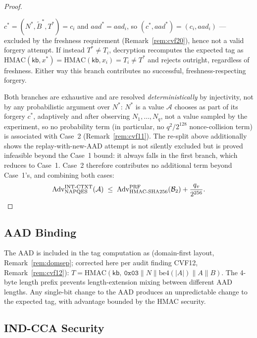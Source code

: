 \documentclass[11pt,a4paper]{article}
\begin{document}
\begin{proof}
\begin{itemize}
        $c^*=(N^*,\widetilde{B}^*,T^*)=c_i$ and $aad^*=aad_i$, so
        $(c^*,aad^*)=(c_i,aad_i)$ --- excluded by the freshness
        requirement (Remark~\ref{rem:cvf20}), hence not a valid forgery
        attempt. If instead $T^* \neq T_i$, decryption recomputes the
        expected tag as $\mathrm{HMAC}(\mathsf{kb},x^*) =
        \mathrm{HMAC}(\mathsf{kb},x_i) = T_i \neq T^*$ and rejects
        outright, regardless of freshness. Either way this branch
        contributes no successful, freshness-respecting forgery.
\end{itemize}
Both branches are exhaustive and are resolved \emph{deterministically} by
injectivity, not by any probabilistic argument over $N^*$: $N^*$ is a
value $\mathcal{A}$ chooses as part of its forgery $c^*$, adaptively and
after observing $N_1,\ldots,N_q$, not a value sampled by the experiment,
so no probability term (in particular, no $q^2/2^{128}$ nonce-collision
term) is associated with Case~2 (Remark~\ref{rem:cvf11}). The re-split
above additionally shows the replay-with-new-AAD attempt is not silently
excluded but is proved infeasible beyond the Case~1 bound: it always
falls in the first branch, which reduces to Case~1. Case~2 therefore
contributes no additional term beyond Case~1's, and combining both cases:
\[
  \mathrm{Adv}^{\mathrm{INT\text{-}CTXT}}_{\mathrm{NAPQES}}(\mathcal{A})
  \;\leq\;
  \mathrm{Adv}^{\mathrm{PRF}}_{\mathrm{HMAC\text{-}SHA256}}(\mathcal{B}_2)
  + \frac{q_v}{2^{256}}. \qedhere
\]
\end{proof}

\subsection{AAD Binding}

The AAD is included in the tag computation as (domain-first layout,
Remark~\ref{rem:domsep}; corrected here per audit finding CVF12,
Remark~\ref{rem:cvf12}):
$T = \mathrm{HMAC}(\mathsf{kb},\ \texttt{0x03} \| N \| \mathrm{be4}(|A|) \| A \| B)$.
The 4-byte length prefix prevents length-extension mixing between different
AAD lengths.  Any single-bit change to the AAD produces an unpredictable
change to the expected tag, with advantage bounded by the HMAC security.

\subsection{IND-CCA Security}
\label{sec:ind-cca}
\end{document}
